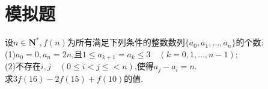 \documentclass[]{article}
\title{}
\author{}
\date{}
\begin{document}
\maketitle
\section{模拟题}{
设$n \in \mathbf{N^*},f(n)$为所有满足下列条件的整数数列$\{ a_0,a_1,…,a_n\}$的个数:\\
(1)$a_0=0,a_n=2n$,且$1\leq a_{k+1}=a_{k}\leq 3\quad(k=0,1,…,n-1)$;\\
(2)不存在$i,j \quad(0\leq i<j\leq <n)$,使得$a_j-a_i=n$.\\
求$3f(16)-2f(15)+f(10)$的值.
}
\end{document}
